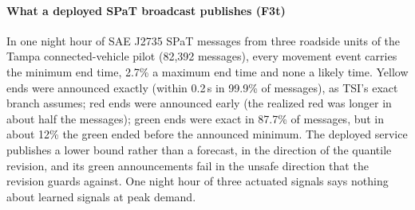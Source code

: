 \paragraph{What a deployed SPaT broadcast publishes (F3t)} In one night hour of SAE J2735 SPaT messages from three roadside units of the
Tampa connected-vehicle pilot \cite{tampaspat} (82,392 messages), every movement event carries the minimum end time, 2.7\% a maximum end
time and none a likely time. Yellow ends were announced exactly (within 0.2\,s in 99.9\% of messages), as TSI's exact branch assumes; red
ends were announced early (the realized red was longer in about half the messages); green ends were exact in 87.7\% of messages, but in
about 12\% the green ended before the announced minimum. The deployed service publishes a lower bound rather than a forecast, in the
direction of the quantile revision, and its green announcements fail in the unsafe direction that the revision guards against. One night
hour of three actuated signals says nothing about learned signals at peak demand.
